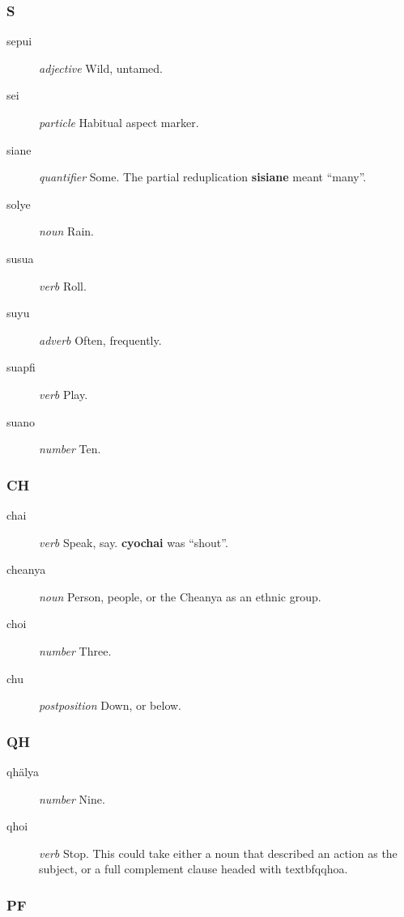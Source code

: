 \documentclass{article}
\begin{document}
\subsubsection{S}

\begin{description}
\item [sepui] \emph{adjective} Wild, untamed.
\item [sei] \emph{particle} Habitual aspect marker.
\item [siane] \emph{quantifier} Some.  The partial reduplication \textbf{sisiane} meant ``many''.
\item [solye] \emph{noun} Rain.
\item [susua] \emph{verb} Roll.
\item [suyu] \emph{adverb} Often, frequently.
\item [suapfi] \emph{verb} Play.
\item [suano] \emph{number} Ten.
\end{description}

\subsubsection{CH}

\begin{description}
\item [chai] \emph{verb} Speak, say.  \textbf{cyochai} was ``shout''.
\item [cheanya] \emph{noun} Person, people, or the Cheanya as an ethnic group.
\item [choi] \emph{number} Three.
\item [chu] \emph{postposition} Down, or below.
\end{description}

\subsubsection{QH}

\begin{description}
\item [qh\"alya] \emph{number} Nine.
\item [qhoi] \emph{verb} Stop.  This could take either a noun that described an action as the subject, or a full complement clause headed with textbf{qqhoa}.
\end{description}

\subsubsection{PF}
\end{document}
